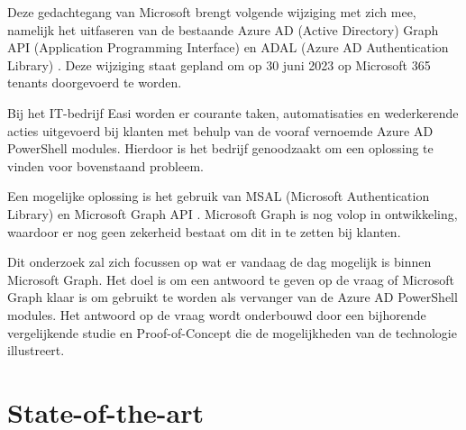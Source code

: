 Deze gedachtegang van Microsoft brengt volgende wijziging met zich mee, namelijk het uitfaseren van de bestaande Azure AD (Active Directory) Graph API (Application Programming Interface) en ADAL (Azure AD Authentication Library) \autocite{Sahay2022}. Deze wijziging staat gepland om op 30 juni 2023 op Microsoft 365 tenants doorgevoerd te worden.

Bij het IT-bedrijf Easi worden er courante taken, automatisaties en wederkerende acties uitgevoerd bij klanten met behulp van de vooraf vernoemde Azure AD PowerShell modules. Hierdoor is het bedrijf genoodzaakt om een oplossing te vinden voor bovenstaand probleem.

Een mogelijke oplossing is het gebruik van MSAL (Microsoft Authentication Library) en Microsoft Graph API \autocite{Microsoft2023}. Microsoft Graph is nog volop in ontwikkeling, waardoor er nog geen zekerheid bestaat om dit in te zetten bij klanten.

Dit onderzoek zal zich focussen op wat er vandaag de dag mogelijk is binnen Microsoft Graph. Het doel is om een antwoord te geven op de vraag of Microsoft Graph klaar is om gebruikt te worden als vervanger van de Azure AD PowerShell modules. Het antwoord op de vraag wordt onderbouwd door een bijhorende vergelijkende studie en Proof-of-Concept die de mogelijkheden van de technologie illustreert.



\section{State-of-the-art}%
\label{sec:state-of-the-art}


